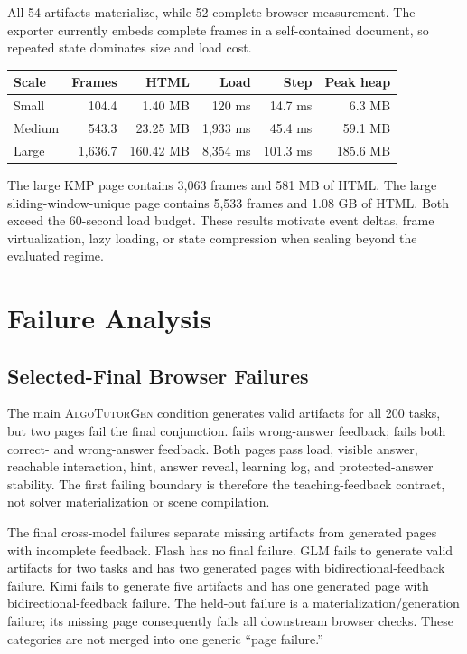 \documentclass[letterpaper]{article}
\newcommand{\system}{\textsc{AlgoTutorGen}}
\newenvironment{coltable}
  {\begin{center}\begin{minipage}{\columnwidth}\centering}
  {\end{minipage}\end{center}}
\begin{document}
All 54 artifacts materialize, while 52 complete browser measurement. The exporter currently embeds complete frames in a self-contained document, so repeated state dominates size and load cost.

\begin{coltable}
\small
\setlength{\tabcolsep}{2pt}
\begin{tabular}{@{}lrrrrr@{}}
\toprule
Scale & Frames & HTML & Load & Step & Peak heap \\
\midrule
Small & 104.4 & 1.40 MB & 120 ms & 14.7 ms & 6.3 MB \\
Medium & 543.3 & 23.25 MB & 1,933 ms & 45.4 ms & 59.1 MB \\
Large & 1,636.7 & 160.42 MB & 8,354 ms & 101.3 ms & 185.6 MB \\
\bottomrule
\end{tabular}
\label{tab:scalability}
\end{coltable}

The large KMP page contains 3,063 frames and 581 MB of HTML. The large sliding-window-unique page contains 5,533 frames and 1.08 GB of HTML. Both exceed the 60-second load budget. These results motivate event deltas, frame virtualization, lazy loading, or state compression when scaling beyond the evaluated regime.

\section{Failure Analysis}

\subsection{Selected-Final Browser Failures}

The main \system{} condition generates valid artifacts for all 200 tasks, but two pages fail the final conjunction.  fails wrong-answer feedback;  fails both correct- and wrong-answer feedback. Both pages pass load, visible answer, reachable interaction, hint, answer reveal, learning log, and protected-answer stability. The first failing boundary is therefore the teaching-feedback contract, not solver materialization or scene compilation.

The final cross-model failures separate missing artifacts from generated pages with incomplete feedback. Flash has no final failure. GLM fails to generate valid artifacts for two tasks and has two generated pages with bidirectional-feedback failure. Kimi fails to generate five artifacts and has one generated page with bidirectional-feedback failure. The held-out failure is a materialization/generation failure; its missing page consequently fails all downstream browser checks. These categories are not merged into one generic ``page failure.''
\end{document}
